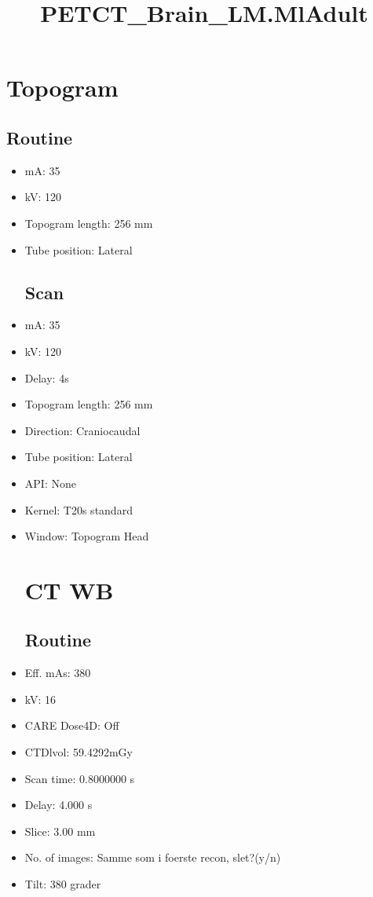 \documentclass[12pt]{article}
\title{PETCT\_Brain\_LM.MlAdult}
\begin{document}
\maketitle
\newpage
\tableofcontents
\newpage
{}


\section{Topogram}
\subsection{Routine}
 \begin{itemize}\item mA: 35\item kV: 120\item Topogram length: 256 mm\item Tube position: Lateral
\subsection{Scan}
\item mA: 35\item kV: 120\item Delay: 4s\item Topogram length: 256 mm\item Direction: Craniocaudal\item Tube position: Lateral\item API: None\item Kernel: T20s standard\item Window: Topogram Head
\section{CT WB}
\subsection{Routine}
\item Eff. mAs: 380\item kV: 16\item CARE Dose4D: Off\item CTDlvol: 59.4292mGy\item Scan time: 0.8000000 s\item Delay: 4.000 s\item Slice: 3.00 mm\item No. of images: Samme som i foerste recon, slet?(y/n)\item Tilt: 380 grader

\end{itemize}
\end{document}
